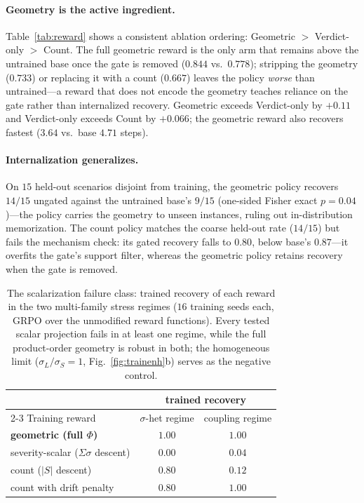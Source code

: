 \paragraph{Geometry is the active ingredient.}
Table~\ref{tab:reward} shows a consistent ablation ordering: Geometric $>$ Verdict-only $>$ Count. The full geometric reward is the only arm that remains above the untrained base once the gate is removed ($0.844$ vs.\ $0.778$); stripping the geometry ($0.733$) or replacing it with a count ($0.667$) leaves the policy \emph{worse} than untrained---a reward that does not encode the geometry teaches reliance on the gate rather than internalized recovery. Geometric exceeds Verdict-only by $+0.11$ and Verdict-only exceeds Count by $+0.066$; the geometric reward also recovers fastest ($3.64$ vs.\ base $4.71$ steps).

\paragraph{Internalization generalizes.}
On $15$ held-out scenarios disjoint from training, the geometric policy recovers $14/15$ ungated against the untrained base's $9/15$ (one-sided Fisher exact $p{=}0.04$)---the policy carries the geometry to unseen instances, ruling out in-distribution memorization. The count policy matches the coarse held-out rate ($14/15$) but fails the mechanism check: its gated recovery falls to $0.80$, below base's $0.87$---it overfits the gate's support filter, whereas the geometric policy retains recovery when the gate is removed.

\begin{table}[t]
\centering
\caption{The scalarization failure class: trained recovery of each reward in the two multi-family stress regimes ($16$ training seeds each, GRPO over the unmodified reward functions). Every tested scalar projection fails in at least one regime, while the full product-order geometry is robust in both; the homogeneous limit ($\sigma_L/\sigma_S{=}1$, Fig.~\ref{fig:trainenh}b) serves as the negative control.}
\label{tab:failureclass}
\begin{tabular}{lcc}
\toprule
 & \multicolumn{2}{c}{trained recovery} \\
\cmidrule(lr){2-3}
Training reward & $\sigma$-het regime & coupling regime \\
\midrule
\textbf{geometric (full $\Phi$)} & $\mathbf{1.00}$ & $\mathbf{1.00}$ \\
severity-scalar ($\Sigma\sigma$ descent) & $0.00$ & $0.04$ \\
count ($|S|$ descent) & $0.80$ & $0.12$ \\
count with drift penalty & $0.80$ & $1.00$ \\
\bottomrule
\end{tabular}
\end{table}

